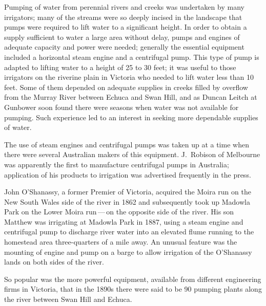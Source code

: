 Pumping of water from perennial rivers and creeks was undertaken by
many irrigators; many of the streams were so deeply incised in the
landscape that pumps were required to lift water to a significant
height.  In order to obtain a supply sufficient to water a large area
without delay, pumps and engines of adequate capacity and power were
needed; generally the essential equipment included a horizontal steam
engine and a centrifugal pump. 
 This type of pump is adapted to lifting water
to a height of 25 to 30 feet; it was useful to those irrigators on the
riverine plain in Victoria who needed to lift water less than 10 feet.
Some of them depended on adequate supplies in creeks filled by
overflow from the Murray River
 between
Echuca  and Swan Hill,  and
as Duncan Leitch  at Gunbower soon found there were
seasons when water was not available for pumping.  Such experience led
to an interest in seeking more dependable supplies of water.

The use of steam engines and centrifugal pumps was taken up at a time
when there were several Australian makers of this equipment.
J.~Robison  of Melbourne was apparently the first
to manufacture centrifugal pumps in Australia; application of his
products to irrigation was advertised frequently in the
press.

John O'Shanassy,  a former Premier of Victoria,
acquired the Moira \index{Moira, NSW} run on the New South Wales side
of the river in 1862 and subsequently took up Madowla Park
  on the Lower  Moira
run\,---\,on the opposite si\-de of the river.  His son Matthew
 was irrigating at Madowla Park in 1887, using
a steam engine and centrifugal pump \index{pump!centrifugal} to
discharge river water into an elevated flume running to the homestead
area three-quarters of a mile away. An unusual feature was the
mounting of engine and pump on a barge to allow irrigation of the
O'Shanassy lands on both sides of the river.

So popular was the more powerful equipment, available from different
engineering firms in Victoria, that in the 1890s there were said to be
90 pumping plants along the river between Swan Hill and
Echuca.

